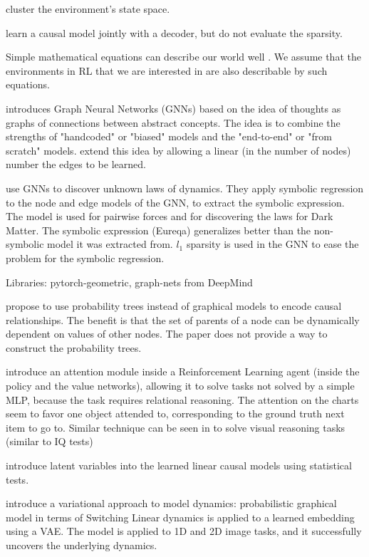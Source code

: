 \documentclass[a4paper,11pt,oneside]{report}
\begin{document}
\cite{Yarats2016} cluster the environment's state space.

\cite{Johnson2016} learn a causal model jointly with a decoder, but do not evaluate the sparsity.

Simple mathematical equations can describe our world well \cite{hamming1980unreasonable}. We assume that the environments in RL that we are interested in are also describable by such equations.

\cite{Battaglia2018} introduces Graph Neural Networks (GNNs) based on the idea of thoughts as graphs of connections between abstract concepts. The idea is to combine the strengths of "handcoded" or "biased" models and the "end-to-end" or "from scratch" models. \cite{Velickovic2020} extend this idea by allowing a linear (in the number of nodes) number the edges to be learned.

\cite{Cranmer2020} use GNNs to discover unknown laws of dynamics. They apply symbolic regression to the node and edge models of the GNN, to extract the symbolic expression. The model is used for pairwise forces and for discovering the laws for Dark Matter. The symbolic expression (Eureqa) generalizes better than the non-symbolic model it was extracted from. $l_1$ sparsity is used in the GNN to ease the problem for the symbolic regression.

Libraries: pytorch-geometric, graph-nets from DeepMind

\cite{Genewein} propose to use probability trees instead of graphical models to encode causal relationships. The benefit is that the set of parents of a node can be dynamically dependent on values of other nodes. The paper does not provide a way to construct the probability trees.

\cite{Zambaldi2018} introduce an attention module inside a Reinforcement Learning agent (inside the policy and the value networks), allowing it to solve tasks not solved by a simple MLP, because the task requires relational reasoning. The attention on the charts seem to favor one object attended to, corresponding to the ground truth next item to go to. Similar technique can be seen in \cite{Hahne2019} to solve visual reasoning tasks (similar to IQ tests)

\cite{Xie2020} introduce latent variables into the learned linear causal models using statistical tests.

\cite{Johnson2016} introduce a variational approach to model dynamics: probabilistic graphical model in terms of Switching Linear dynamics is applied to a learned embedding using a VAE. The model is applied to 1D and 2D image tasks, and it successfully uncovers the underlying dynamics.
\end{document}
